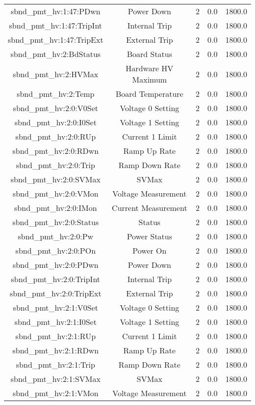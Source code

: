 \begin{table}[ptb]
\begin{tabular}{c | c c c c}
sbnd_pmt_hv:1:47:PDwn & Power Down & 2 & 0.0 & 1800.0\\ 
sbnd_pmt_hv:1:47:TripInt & Internal Trip & 2 & 0.0 & 1800.0\\ 
sbnd_pmt_hv:1:47:TripExt & External Trip & 2 & 0.0 & 1800.0\\ 
sbnd_pmt_hv:2:BdStatus & Board Status & 2 & 0.0 & 1800.0\\ 
sbnd_pmt_hv:2:HVMax & Hardware HV Maximum & 2 & 0.0 & 1800.0\\ 
sbnd_pmt_hv:2:Temp & Board Temperature & 2 & 0.0 & 1800.0\\ 
sbnd_pmt_hv:2:0:V0Set & Voltage 0 Setting & 2 & 0.0 & 1800.0\\ 
sbnd_pmt_hv:2:0:I0Set & Voltage 1 Setting & 2 & 0.0 & 1800.0\\ 
sbnd_pmt_hv:2:0:RUp & Current 1 Limit & 2 & 0.0 & 1800.0\\ 
sbnd_pmt_hv:2:0:RDwn & Ramp Up Rate & 2 & 0.0 & 1800.0\\ 
sbnd_pmt_hv:2:0:Trip & Ramp Down Rate & 2 & 0.0 & 1800.0\\ 
sbnd_pmt_hv:2:0:SVMax & SVMax & 2 & 0.0 & 1800.0\\ 
sbnd_pmt_hv:2:0:VMon & Voltage Measurement & 2 & 0.0 & 1800.0\\ 
sbnd_pmt_hv:2:0:IMon & Current Measurement & 2 & 0.0 & 1800.0\\ 
sbnd_pmt_hv:2:0:Status & Status & 2 & 0.0 & 1800.0\\ 
sbnd_pmt_hv:2:0:Pw & Power Status & 2 & 0.0 & 1800.0\\ 
sbnd_pmt_hv:2:0:POn & Power On & 2 & 0.0 & 1800.0\\ 
sbnd_pmt_hv:2:0:PDwn & Power Down & 2 & 0.0 & 1800.0\\ 
sbnd_pmt_hv:2:0:TripInt & Internal Trip & 2 & 0.0 & 1800.0\\ 
sbnd_pmt_hv:2:0:TripExt & External Trip & 2 & 0.0 & 1800.0\\ 
sbnd_pmt_hv:2:1:V0Set & Voltage 0 Setting & 2 & 0.0 & 1800.0\\ 
sbnd_pmt_hv:2:1:I0Set & Voltage 1 Setting & 2 & 0.0 & 1800.0\\ 
sbnd_pmt_hv:2:1:RUp & Current 1 Limit & 2 & 0.0 & 1800.0\\ 
sbnd_pmt_hv:2:1:RDwn & Ramp Up Rate & 2 & 0.0 & 1800.0\\ 
sbnd_pmt_hv:2:1:Trip & Ramp Down Rate & 2 & 0.0 & 1800.0\\ 
sbnd_pmt_hv:2:1:SVMax & SVMax & 2 & 0.0 & 1800.0\\ 
sbnd_pmt_hv:2:1:VMon & Voltage Measurement & 2 & 0.0 & 1800.0\\ 

\end{tabular}
\end{table}
